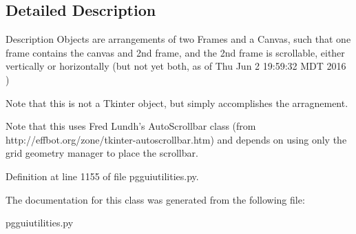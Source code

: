 \subsection{Detailed Description}
\begin{DoxyVerb}Description
Objects are arrangements of two Frames and a 
Canvas, such that one frame contains the 
canvas and 2nd frame, and the 2nd frame 
is scrollable, either vertically or horizontally 
(but not yet both, as of Thu Jun  2 19:59:32 MDT 2016 )


Note that this is not a Tkinter object, but
simply accomplishes the arragnement. 

Note that this uses Fred Lundh's AutoScrollbar class
(from http://effbot.org/zone/tkinter-autoscrollbar.htm)
and depends on using only the grid geometry manager to place
the scrollbar.
\end{DoxyVerb}
 

Definition at line 1155 of file pgguiutilities.\+py.



The documentation for this class was generated from the following file\+:\begin{DoxyCompactItemize}
\item 
pgguiutilities.\+py\end{DoxyCompactItemize}
